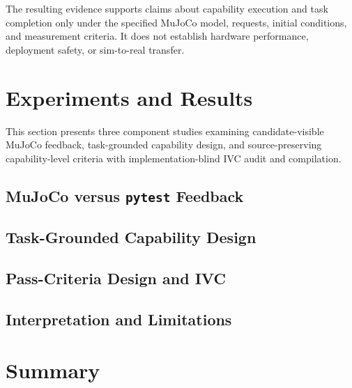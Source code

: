 The resulting evidence supports claims about capability execution and task
completion only under the specified MuJoCo model, requests, initial conditions,
and measurement criteria. It does not establish hardware performance,
deployment safety, or sim-to-real transfer.

\section{Experiments and Results}

This section presents three component studies examining candidate-visible
MuJoCo feedback, task-grounded capability design, and source-preserving
capability-level criteria with implementation-blind IVC audit and compilation.

\subsection{MuJoCo versus \texttt{pytest} Feedback}

\subsection{Task-Grounded Capability Design}

\subsection{Pass-Criteria Design and IVC}

\subsection{Interpretation and Limitations}

\section{Summary}
